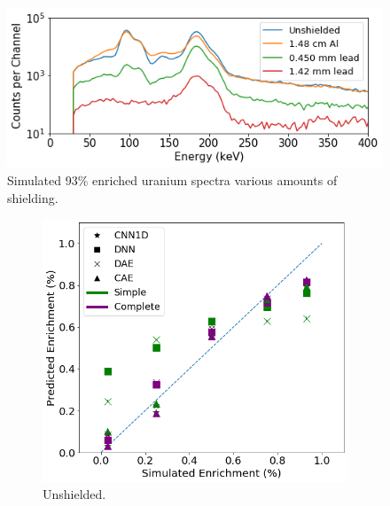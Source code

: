\begin{figure}[H]
	\centering
	\includegraphics[width=0.8\linewidth]{images/simulated_uranium_shielding.png}
	\caption{Simulated 93\% enriched uranium spectra various amounts of shielding.}
	\label{fig:simulated_uranium_shielding}
\end{figure}

\begin{figure}[H]
     \centering
     \begin{subfigure}[b]{0.49\textwidth}
         \centering
         \includegraphics[width=\textwidth]{images/simuranium-noshield.png}
         \caption{Unshielded.}
         \label{fig:simuranium-noshield}
     \end{subfigure}
     \hfill
     \begin{subfigure}[b]{0.49\textwidth}
         \centering

\end{subfigure}
\end{figure}
